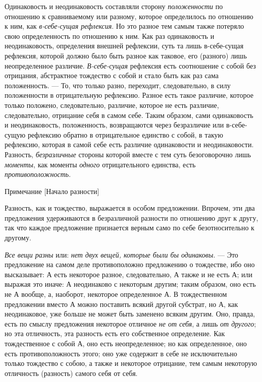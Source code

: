 Одинаковость и неодинаковость составляли сторону
{\em положенности} по отношению к сравниваемому или
разному, которое определилось по отношению к ним, как
{\em в-себе-сущая рефлексия}. Но это разное тем самым
также потеряло свою определенность по отношению к ним. Как раз одинаковость
и неодинаковость, определения внешней рефлексии, суть та лишь в-себе-сущая
рефлексия, которой должно было быть разное как таковое, его (разного) лишь
неопределенное различие. {\em В-себе-сущая} рефлексия
есть соотношение с собой без отрицания, абстрактное тождество с собой и
стало быть как раз сама положенность. — То, что только разно, переходит,
следовательно, в силу положенности в отрицательную рефлексию. Разное есть
такое различие, которое только положено, следовательно, различие, которое
не есть различие, следовательно, отрицание себя в самом себе. Таким
образом, сами одинаковость и неодинаковость, положенность, возвращаются
через безразличие или в-себе-сущую рефлексию обратно в отрицательное
единство с собой, в такую рефлексию, которая в самой себе есть различие
одинаковости и неодинаковости. Разность,
{\em безразличные} стороны которой вместе с тем суть
безоговорочно лишь {\em моменты}, как моменты
{\em одного} отрицательного единства, есть
{\em противоположность}.

{\centering
Примечание
[Начало разности]
\par}

Разность, как и тождество, выражается в особом предложении. Впрочем, эти два
предложения удерживаются в безразличной разности по отношению друг к другу,
так что каждое предложение признается верным само по себе безотносительно к
другому.

{\em Все вещи разны} или: {\em нет
двух вещей, которые были бы одинаковы}. — Это предложение на самом деле
противоположно предложению о тождестве, ибо оно высказывает: $А$
есть некоторое разное, следовательно, $А$ также и не есть
$А$; или выражая это иначе: $А$ неодинаково с некоторым
другим; таким образом, оно есть не $А$ вообще, а, наоборот,
некоторое определенное $А$. В тождественном предложении вместо
$А$ можно поставить всякий другой субстрат, но $А$, как
неодинаковое, уже больше не может быть заменено всяким другим. Оно, правда,
есть по смыслу предложения некоторое отличное {\em не
от себя}, а лишь {\em от другого}; но эта отличность,
эта разность есть его собственное определение. Как тождественное с собой
$А$, оно есть неопределенное; но как определенное, оно есть
противоположность этого; оно уже содержит в себе не исключительно только
тождество с собою, а также и некоторое отрицание, тем самым некоторую
отличность (разность) самого себя от себя.

